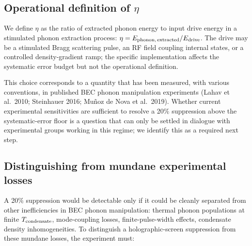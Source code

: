 \documentclass[11pt]{article}
\begin{document}
\subsection{\texorpdfstring{Operational definition of \(\eta\)}{Operational definition of \textbackslash eta}}\label{operational-definition-of-eta}

We define \(\eta\) as the ratio of extracted phonon energy to input drive energy in a stimulated phonon extraction process: \(\eta = E_{\rm phonon,\,extracted}/E_{\rm drive}\). The drive may be a stimulated Bragg scattering pulse, an RF field coupling internal states, or a controlled density-gradient ramp; the specific implementation affects the systematic error budget but not the operational definition.

This choice corresponds to a quantity that has been measured, with various conventions, in published BEC phonon manipulation experiments (Lahav et al.~2010; Steinhauer 2016; Muñoz de Nova et al.~2019). Whether current experimental sensitivities are sufficient to resolve a 20\% suppression above the systematic-error floor is a question that can only be settled in dialogue with experimental groups working in this regime; we identify this as a required next step.

\subsection{Distinguishing from mundane experimental losses}\label{distinguishing-from-mundane-experimental-losses}

A 20\% suppression would be detectable only if it could be cleanly separated from other inefficiencies in BEC phonon manipulation: thermal phonon populations at finite \(T_{\rm condensate}\), mode-coupling losses, finite-pulse-width effects, condensate density inhomogeneities. To distinguish a holographic-screen suppression from these mundane losses, the experiment must:
\end{document}
